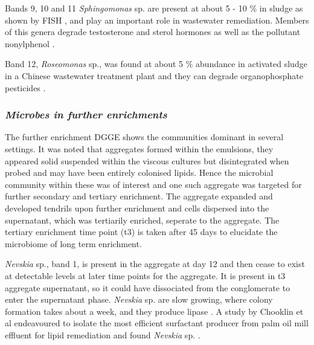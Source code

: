 \documentclass[11pt]{article}
\begin{document}
Bands 9, 10 and 11 \emph{Sphingomonas} sp. are present at about 5 - 10 \% in sludge as shown by FISH \cite{neef1999detection}, and play an important role in wastewater remediation. Members of this genera degrade testosterone and sterol hormones as well as the pollutant nonylphenol \cite{fujii2001sphingomonas,roh201017beta}.


Band 12, \emph{Roseomonas} sp., was found at about 5 \% abundance in activated sludge in a Chinese wastewater treatment plant and they can degrade organophosphate pesticides \cite{jiang2008bacterial,jiang2006isolation}.

\subsubsection{\emph{Microbes in further enrichments}}
The further enrichment DGGE shows the communities dominant in several settings. It was noted that aggregates formed within the emulsions, they appeared solid suspended within the viscous cultures but disintegrated when probed and may have been entirely colonised lipids. Hence the microbial community within these was of interest and one such aggregate was targeted for further secondary and tertiary enrichment. The aggregate expanded and developed tendrils upon further enrichment and cells dispersed into the supernatant, which was tertiarily enriched, seperate to the aggregate. The tertiary enrichment time point (t3) is taken after 45 days to elucidate the microbiome of long term enrichment.


\emph{Nevskia} sp., band 1, is present in the aggregate at day 12 and then cease to exist at detectable levels at later time points for the aggregate. It is present in t3 aggregate supernatant, so it could have dissociated from the conglomerate to enter the supernatant phase. \emph{Nevskia} sp. are slow growing, where colony formation takes about a week, and they produce lipase \cite{kim2011nevskia}. A study by Chooklin et al endeavoured to isolate the most efficient surfactant producer from palm oil mill effluent for lipid remediation and found \emph{Nevskia} sp. \cite{chooklinutilization}.
\end{document}
